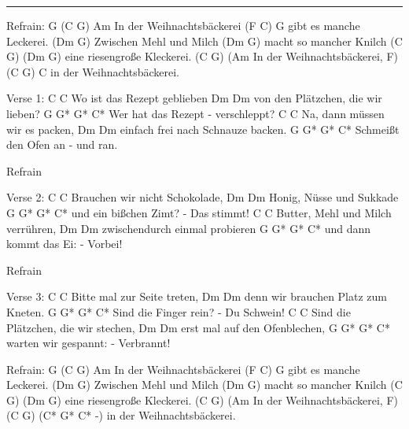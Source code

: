 \noindent\rule{\columnwidth}{1pt}

\begin{multicols}{2}
\begin{lstsong}
Refrain:
G        (C         G)    Am
   In der Weihnachtsbäckerei
         (F     C)   G
gibt es manche Leckerei.
        (Dm       G)
Zwischen Mehl und Milch
        (Dm      G)
macht so mancher Knilch
    (C     G)   (Dm    G)
eine riesengroße Kleckerei.
      (C         G)   (Am
In der Weihnachtsbäckerei,
F)    (C         G)     C
in der Weihnachtsbäckerei.

Verse 1:
C            C
Wo ist das Rezept geblieben
Dm                 Dm
von den Plätzchen, die wir lieben?
G             G*     G* C*
Wer hat das Rezept - verschleppt?
C               C
Na, dann müssen wir es packen,
Dm                Dm
einfach frei nach Schnauze backen.
G                 G*   G*  C*
Schmeißt den Ofen an - und ran.

Refrain

Verse 2:
C                  C
Brauchen wir nicht Schokolade,
Dm           Dm
Honig, Nüsse und Sukkade
G               G*      G*  C*
und ein bißchen Zimt? - Das stimmt!
C                C
Butter, Mehl und Milch verrühren,
Dm                   Dm
zwischendurch einmal probieren
G                  G*    G* C*
und dann kommt das Ei: - Vorbei!
\end{lstsong}\vfill\columnbreak\begin{lstsong}
Refrain

Verse 3:
C                   C
Bitte mal zur Seite treten,
Dm                Dm
denn wir brauchen Platz zum Kneten.
G               G*      G* C*
Sind die Finger rein? - Du Schwein!
C                   C
Sind die Plätzchen, die wir stechen,
Dm               Dm
erst mal auf den Ofenblechen,
G          G*          G* C*
warten wir gespannt: - Verbrannt!

Refrain:
G        (C         G)    Am
   In der Weihnachtsbäckerei
         (F     C)   G
gibt es manche Leckerei.
        (Dm       G)
Zwischen Mehl und Milch
        (Dm      G)
macht so mancher Knilch
    (C     G)   (Dm    G)
eine riesengroße Kleckerei.
      (C         G)   (Am
In der Weihnachtsbäckerei,
F)    (C         G)    (C* G* C* -)
in der Weihnachtsbäckerei.
\end{lstsong}
\end{multicols}
\newpage

